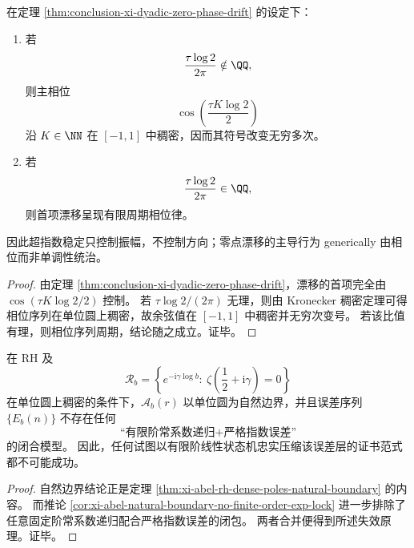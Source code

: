 \begin{corollary}[零点稳定的相位统治]\label{cor:conclusion-xi-dyadic-phase-governed-stability}
在定理 \ref{thm:conclusion-xi-dyadic-zero-phase-drift} 的设定下：
\begin{enumerate}
  \item 若
  \[
  \frac{\tau\log2}{2\pi}\notin\QQ,
  \]
  则主相位
  \[
  \cos\!\left(\frac{\tau K\log2}{2}\right)
  \]
  沿 \(K\in\NN\) 在 \([-1,1]\) 中稠密，因而其符号改变无穷多次。

  \item 若
  \[
  \frac{\tau\log2}{2\pi}\in\QQ,
  \]
  则首项漂移呈现有限周期相位律。
\end{enumerate}
因此超指数稳定只控制振幅，不控制方向；零点漂移的主导行为 generically 由相位而非单调性统治。
\end{corollary}
\begin{proof}
由定理 \ref{thm:conclusion-xi-dyadic-zero-phase-drift}，漂移的首项完全由
\(
\cos(\tau K\log2/2)
\)
控制。
若 \(\tau\log2/(2\pi)\) 无理，则由 Kronecker 稠密定理可得相位序列在单位圆上稠密，故余弦值在 \([-1,1]\) 中稠密并无穷次变号。
若该比值有理，则相位序列周期，结论随之成立。证毕。
\end{proof}

\begin{proposition}[自然边界下的有限阶递归证书失效]\label{prop:conclusion-xi-natural-boundary-no-finite-recursive-certificate}
在 RH 及
\[
\mathcal R_b=\left\{e^{-\mathrm{i}\gamma\log b}:\ \zeta\!\left(\frac12+\mathrm{i}\gamma\right)=0\right\}
\]
在单位圆上稠密的条件下，\(\mathcal A_b(r)\) 以单位圆为自然边界，并且误差序列 \(\{E_b(n)\}\) 不存在任何
\[
\text{“有限阶常系数递归}+\text{严格指数误差”}
\]
的闭合模型。
因此，任何试图以有限阶线性状态机忠实压缩该误差层的证书范式都不可能成功。
\end{proposition}
\begin{proof}
自然边界结论正是定理 \ref{thm:xi-abel-rh-dense-poles-natural-boundary} 的内容。
而推论 \ref{cor:xi-abel-natural-boundary-no-finite-order-exp-lock} 进一步排除了任意固定阶常系数递归配合严格指数误差的闭包。
两者合并便得到所述失效原理。证毕。
\end{proof}

